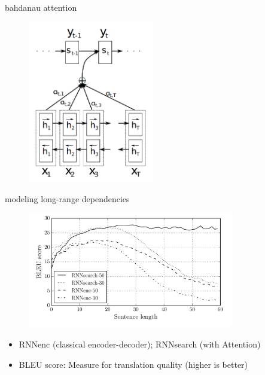 \begin{frame}{bahdanau attention}
	
\vfill

\begin{figure}
	\centering
		\includegraphics[width = 5.5cm]{figure/bahdanau-attention.png}\\ 
\end{figure}

\vfill
	
\end{frame}


\begin{frame}{modeling long-range dependencies}
	
\vfill

\begin{figure}
	\centering
		\includegraphics[width = 9cm]{figure/bahdanau14.png}\\ 
\end{figure}

\begin{itemize}
	\item RNNenc (classical encoder-decoder); RNNsearch (with Attention)
	\item BLEU score: Measure for translation quality (higher is better)
\end{itemize}

\vfill
	
\end{frame}

